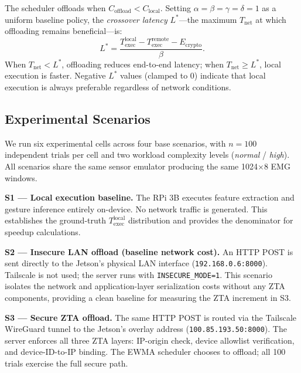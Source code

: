 \documentclass[10pt,twocolumn]{article}
\begin{document}
The scheduler offloads when $C_{\text{offload}} < C_{\text{local}}$.
Setting $\alpha = \beta = \gamma = \delta = 1$ as a uniform baseline policy,
the \emph{crossover latency} $L^*$—the maximum $T_{\text{net}}$ at which
offloading remains beneficial—is:
\begin{equation}
L^* = \frac{T_{\text{exec}}^{\text{local}}
           - T_{\text{exec}}^{\text{remote}}
           - E_{\text{crypto}}}{\beta}.
\label{eq:lstar}
\end{equation}
When $T_{\text{net}} < L^*$, offloading reduces end-to-end latency; when
$T_{\text{net}} \geq L^*$, local execution is faster.  Negative $L^*$ values
(clamped to 0) indicate that local execution is always preferable regardless
of network conditions.

\subsection{Experimental Scenarios}

We run six experimental cells across four base scenarios, with $n=100$
independent trials per cell and two workload complexity levels
(\emph{normal} / \emph{high}).  All scenarios share the same sensor emulator
producing the same 1024$\times$8 EMG windows.

\textbf{S1 — Local execution baseline.}  The RPi 3B executes feature
extraction and gesture inference entirely on-device.  No network traffic is
generated.  This establishes the ground-truth $T_{\text{exec}}^{\text{local}}$
distribution and provides the denominator for speedup calculations.

\textbf{S2 — Insecure LAN offload (baseline network cost).}  An HTTP POST
is sent directly to the Jetson's physical LAN interface
(\texttt{192.168.0.6:8000}).  Tailscale is not used; the server runs with
\texttt{INSECURE\_MODE=1}.  This scenario isolates the network and
application-layer serialization costs without any ZTA components, providing
a clean baseline for measuring the ZTA increment in S3.

\textbf{S3 — Secure ZTA offload.}  The same HTTP POST is routed via the
Tailscale WireGuard tunnel to the Jetson's overlay address
(\texttt{100.85.193.50:8000}).  The server enforces all three ZTA layers:
IP-origin check, device allowlist verification, and device-ID-to-IP binding.
The EWMA scheduler chooses to offload; all 100 trials exercise the full
secure path.
\end{document}
